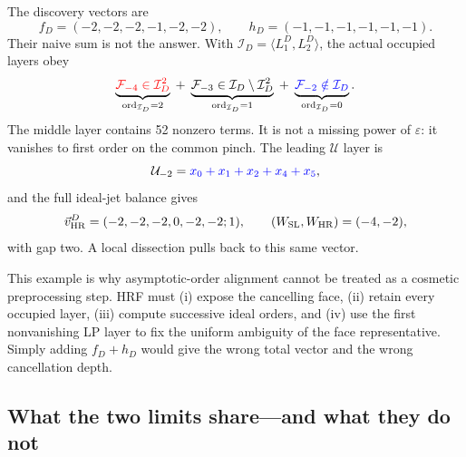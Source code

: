 \documentclass[a4paper,11pt]{article}
\newcommand{\WSL}{W_{\rm SL}}
\newcommand{\WHR}{W_{\rm HR}}
\newcommand{\vHR}{\vec v_{\rm HR}}
\newcommand{\ideal}{\mathcal I}
\newcommand{\SLcolour}[1]{{\color{red}#1}}
\newcommand{\HRcolour}[1]{{\color{blue}#1}}
\newcommand{\Othercolour}[1]{{\color{black}#1}}
\begin{document}
The discovery vectors are
\begin{equation}
 f_D=(-2,-2,-2,-1,-2,-2),\qquad
 h_D=(-1,-1,-1,-1,-1,-1).
 \label{eq:dsc-discovery-vectors}
\end{equation}
Their naive sum is not the answer.  With
\(\ideal_D=\langle L_1^D,L_2^D\rangle\), the actual occupied layers obey
\begin{equation}
 \underbrace{\SLcolour{\mathcal F_{-4}\in\ideal_D^2}}_{
  \operatorname{ord}_{\ideal_D}=2}
 \; +\;
 \underbrace{\Othercolour{\mathcal F_{-3}\in\ideal_D\setminus\ideal_D^2}}_{
  \operatorname{ord}_{\ideal_D}=1}
 \; +\;
 \underbrace{\HRcolour{\mathcal F_{-2}\notin\ideal_D}}_{
  \operatorname{ord}_{\ideal_D}=0}.
 \label{eq:dsc-two-layer-colours}
\end{equation}
The middle layer contains 52 nonzero terms.  It is not a missing power of
\(\varepsilon\): it vanishes to first order on the common pinch.  The leading
\(\mathcal U\) layer is
\begin{equation}
 \mathcal U_{-2}=\HRcolour{x_0+x_1+x_2+x_4+x_5},
 \label{eq:dsc-U-leading}
\end{equation}
and the full ideal-jet balance gives
\begin{equation}
 \vHR^D=(-2,-2,-2,0,-2,-2;1),
 \qquad (\WSL,\WHR)=(-4,-2),
 \label{eq:dsc-vector-example}
\end{equation}
with gap two.  A local dissection pulls back to this same vector.

This example is why asymptotic-order alignment cannot be treated as a
cosmetic preprocessing step.  HRF must (i) expose the cancelling face,
(ii) retain every occupied layer, (iii) compute successive ideal orders,
and (iv) use the first nonvanishing LP layer to fix the uniform ambiguity of
the face representative.  Simply adding \(f_D+h_D\) would give the wrong
total vector and the wrong cancellation depth.

\subsection{What the two limits share---and what they do not}
\end{document}
